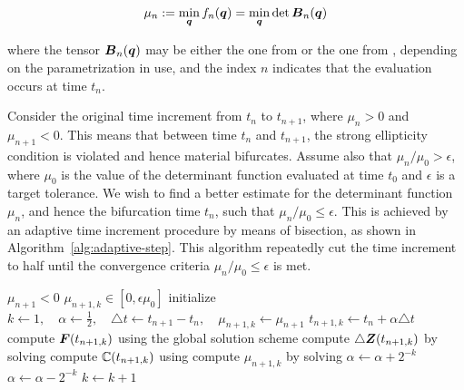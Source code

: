 \documentclass[12pt]{article}
\numberwithin{equation}{section}
\begin{document}
\begin{equation} \label{eq:general-minimization-problem}
  \mu_n := \min_{{\boldsymbol{q}}} f_n({\boldsymbol{q}}) = \min_{{\boldsymbol{q}}} \det {\boldsymbol{B}}_n({\boldsymbol{q}})
\end{equation}

where the tensor ${\boldsymbol{B}}_n({\boldsymbol{q}})$ may be either the one from
 or the one from
, depending on the parametrization
in use, and the index $n$ indicates that the evaluation occurs at time
$t_n$. 

Consider the original time increment from $t_n$ to $t_{n+1}$, where 
$\mu_n > 0$ and $\mu_{n+1} < 0$. This means that between time $t_n$ 
and $t_{n+1}$, the strong ellipticity condition is violated and hence 
material bifurcates. Assume also that $\mu_n / \mu_0 > \epsilon$, 
where $\mu_0$ is the value of the determinant function evaluated at 
time $t_0$ and $\epsilon$ is a target tolerance. We wish to find a 
better estimate for the determinant function $\mu_n$, and hence the 
bifurcation time $t_n$, such that $\mu_n / \mu_0 \le \epsilon$. This 
is achieved by an adaptive time increment procedure by means of 
bisection, as shown in Algorithm~\ref{alg:adaptive-step}. This 
algorithm repeatedly cut the time increment to half until the 
convergence criteria $\mu_n / \mu_0 \le \epsilon$ is met.

\begin{algorithm}
  \caption{$\text{AdaptiveStep}(\mu_0, \mu_{n+1}, t_{n+1}, \epsilon)$}
  \begin{algorithmic}
    \REQUIRE $\mu_{n+1} < 0$
    \ENSURE $\mu_{n+1,k} \in [0, \epsilon \mu_0]$
    \STATE initialize
    $k \leftarrow 1,
    \quad
    \alpha \leftarrow \frac{1}{2},
    \quad
    \triangle t \leftarrow t_{n+1} - t_n,
    \quad
    \mu_{n+1,k} \leftarrow \mu_{n+1}$
    \STATE $t_{n+1,k} \leftarrow t_n + \alpha \triangle t$
    \STATE compute ${\boldsymbol{F}}(t_{n+1,k})$ using the global solution scheme
    \STATE compute $\triangle {\boldsymbol{Z}}(t_{n+1,k})$
    by solving 
    \STATE compute $\mathbb{C}(t_{n+1,k})$
    using 
    \STATE compute $\mu_{n+1,k}$
    by solving 
    \STATE $\alpha \leftarrow \alpha + 2^{-k}$
    \ELSE
    \STATE $\alpha \leftarrow \alpha - 2^{-k}$
    \ENDIF
    \STATE $k \leftarrow k+1$
    \ENDWHILE
  \end{algorithmic}
  \label{alg:adaptive-step}
\end{algorithm}
\end{document}
